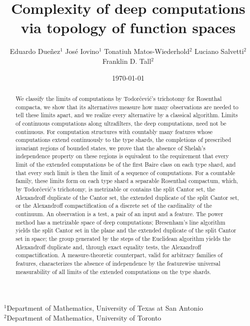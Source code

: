 \documentclass[psamsfonts]{amsart}
\title[Complexity of deep computations via topology of function spaces]{Complexity of deep computations\\ via topology of function spaces}
\author[Dueñez, Iovino, Matos-Wiederhold, Salvetti, Tall]{
Eduardo Dueñez$^{1}$ \qquad
José Iovino$^{1}$ \qquad
Tonatiuh Matos-Wiederhold$^{2}$ \qquad
Luciano Salvetti$^{2}$ \qquad
Franklin D. Tall$^{2}$
}
\date{\today}
\theoremstyle{definition}
\theoremstyle{remark}
\numberwithin{equation}{section}
\begin{document}
\setlength{\emergencystretch}{1.5em}%
\enlargethispage{3pt}%

\maketitle

{\centering\tiny\vspace{-0.6cm}
  $^{1}$Department of Mathematics, University of Texas at San Antonio\\
  $^{2}$Department of Mathematics, University of Toronto\\
}

\begin{abstract}
We classify the limits of computations by Todorčević's trichotomy for Rosenthal compacta, we show that its alternatives measure how many observations are needed to tell these limits apart, and we realize every alternative by a classical algorithm.
Limits of continuous computations along ultrafilters, the deep computations, need not be continuous.
For computation structures with countably many features whose computations extend continuously to the type shards, the completions of prescribed invariant regions of bounded states, we prove that the absence of Shelah's independence property on these regions is equivalent to the requirement that every limit of the extended computations be of the first Baire class on each type shard, and that every such limit is then the limit of a sequence of computations.
For a countable family, these limits form on each type shard a separable Rosenthal compactum, which, by Todorčević's trichotomy, is metrizable or contains the split Cantor set, the Alexandroff duplicate of the Cantor set, the extended duplicate of the split Cantor set, or the Alexandroff compactification of a discrete set of the cardinality of the continuum.
An observation is a test, a pair of an input and a feature.
The power method has a metrizable space of deep computations; Bresenham's line algorithm yields the split Cantor set in the plane and the extended duplicate of the split Cantor set in space; the group generated by the steps of the Euclidean algorithm yields the Alexandroff duplicate and, through exact equality tests, the Alexandroff compactification.
A measure-theoretic counterpart, valid for arbitrary families of features, characterizes the absence of independence by the featurewise universal measurability of all limits of the extended computations on the type shards.
\end{abstract}
\end{document}
